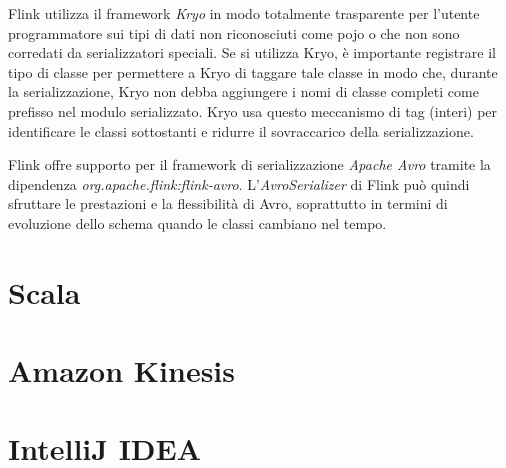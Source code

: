 \label{sec:kryo}
Flink utilizza il \gls{framework} \textit{Kryo} in modo totalmente trasparente per l'utente programmatore sui tipi di dati non riconosciuti come \gls{pojo} o che non sono corredati da serializzatori speciali. Se si utilizza Kryo, è importante registrare il tipo di classe per permettere a Kryo di taggare tale classe in modo che, durante la \gls{serializzazione}, Kryo non debba aggiungere i nomi di classe completi come prefisso nel modulo serializzato. Kryo usa questo meccanismo di tag (interi) per identificare le classi sottostanti e ridurre il sovraccarico della \gls{serializzazione}.



\label{sec:avro}
Flink offre supporto per il \gls{framework} di \gls{serializzazione} \textit{Apache Avro} tramite la dipendenza \textit{org.apache.flink:flink-avro}. L'\textit{AvroSerializer} di Flink può quindi sfruttare le prestazioni e la flessibilità di Avro, soprattutto in termini di evoluzione dello schema quando le classi cambiano nel tempo.
\section{Scala}

\section{Amazon Kinesis}

\section{IntelliJ IDEA}

